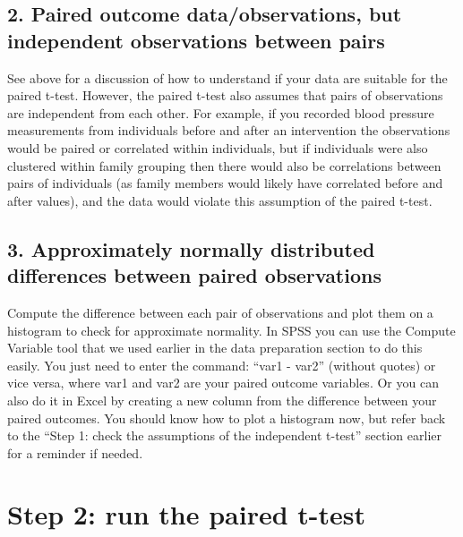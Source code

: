 \documentclass[
]{book}
\begin{document}
\hypertarget{paired-outcome-dataobservations-but-independent-observations-between-pairs}{%
\subsection{2. Paired outcome data/observations, but independent observations between pairs}\label{paired-outcome-dataobservations-but-independent-observations-between-pairs}}

See above for a discussion of how to understand if your data are suitable for the paired t-test. However, the paired t-test also assumes that pairs of observations are independent from each other. For example, if you recorded blood pressure measurements from individuals before and after an intervention the observations would be paired or correlated within individuals, but if individuals were also clustered within family grouping then there would also be correlations between pairs of individuals (as family members would likely have correlated before and after values), and the data would violate this assumption of the paired t-test.

\hypertarget{approximately-normally-distributed-differences-between-paired-observations}{%
\subsection{3. Approximately normally distributed differences between paired observations}\label{approximately-normally-distributed-differences-between-paired-observations}}

Compute the difference between each pair of observations and plot them on a histogram to check for approximate normality. In SPSS you can use the Compute Variable tool that we used earlier in the data preparation section to do this easily. You just need to enter the command: ``var1 - var2'' (without quotes) or vice versa, where var1 and var2 are your paired outcome variables. Or you can also do it in Excel by creating a new column from the difference between your paired outcomes. You should know how to plot a histogram now, but refer back to the ``Step 1: check the assumptions of the independent t-test'' section earlier for a reminder if needed.

\hypertarget{step-2-run-the-paired-t-test}{%
\section{Step 2: run the paired t-test}\label{step-2-run-the-paired-t-test}}
\end{document}
